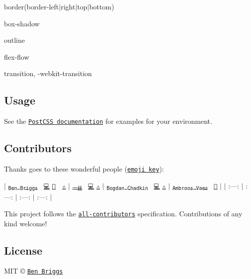 \begin{DoxyItemize}
\item {\ttfamily border(border-\/left$\vert$right$\vert$top$\vert$bottom)}
\item {\ttfamily box-\/shadow}
\item {\ttfamily outline}
\item {\ttfamily flex-\/flow}
\item {\ttfamily transition}, {\ttfamily -\/webkit-\/transition}
\end{DoxyItemize}

\subsection*{Usage}

See the \href{https://github.com/postcss/postcss#usage}{\tt Post\+C\+SS documentation} for examples for your environment.

\subsection*{Contributors}

Thanks goes to these wonderful people (\href{https://github.com/kentcdodds/all-contributors#emoji-key}{\tt emoji key})\+:

$\vert$ \href{http://beneb.info}{\tt \textsubscript{Ben Briggs}}~\newline
\href{https://github.com/ben-eb/postcss-ordered-values/commits?author=ben-eb}{\tt 💻} \href{https://github.com/ben-eb/postcss-ordered-values/commits?author=ben-eb}{\tt 📖} 👀 \href{https://github.com/ben-eb/postcss-ordered-values/commits?author=ben-eb}{\tt ⚠️} $\vert$ \href{www.iyunlu.com/view}{\tt \textsubscript{一丝}}~\newline
\href{https://github.com/ben-eb/postcss-ordered-values/commits?author=yisibl}{\tt 💻} \href{https://github.com/ben-eb/postcss-ordered-values/commits?author=yisibl}{\tt ⚠️} $\vert$ \href{https://github.com/TrySound}{\tt \textsubscript{Bogdan Chadkin}}~\newline
\href{https://github.com/ben-eb/postcss-ordered-values/commits?author=TrySound}{\tt 💻} \href{https://github.com/ben-eb/postcss-ordered-values/commits?author=TrySound}{\tt ⚠️} $\vert$ \href{https://github.com/Ambroos}{\tt \textsubscript{Ambroos Vaes}}~\newline
\href{https://github.com/ben-eb/postcss-ordered-values/issues?q=author%3AAmbroos}{\tt 🐛} $\vert$ $\vert$ \+:---\+: $\vert$ \+:---\+: $\vert$ \+:---\+: $\vert$ \+:---\+: $\vert$

This project follows the \href{https://github.com/kentcdodds/all-contributors}{\tt all-\/contributors} specification. Contributions of any kind welcome!

\subsection*{License}

M\+IT © \href{http://beneb.info}{\tt Ben Briggs} 